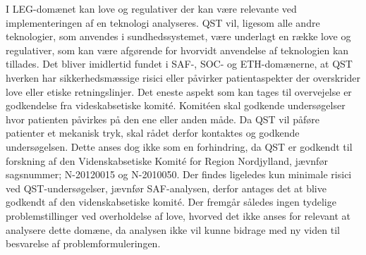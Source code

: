 I LEG-domænet kan love og regulativer der kan være relevante ved implementeringen af en teknologi analyseres. QST vil, ligesom alle andre teknologier, som anvendes i sundhedssystemet, være underlagt en række love og regulativer, som kan være afgørende for hvorvidt anvendelse af teknologien kan tillades. Det bliver imidlertid fundet i SAF-, SOC- og ETH-domænerne, at QST hverken har sikkerhedsmæssige risici eller påvirker patientaspekter der overskrider love eller etiske retningslinjer. Det eneste aspekt som kan tages til overvejelse er godkendelse fra videskabsetiske komité. Komitéen skal godkende undersøgelser hvor patienten påvirkes på den ene eller anden måde. Da QST vil påføre patienter et mekanisk tryk, skal rådet derfor kontaktes og godkende undersøgelsen.\citep{EtiskLov} Dette anses dog ikke som en forhindring, da QST er godkendt til forskning af den Videnskabsetiske Komité for Region Nordjylland, jævnfør sagsnummer; N-20120015 og N-2010050. Der findes ligeledes kun  minimale risici ved QST-undersøgelser, jævnfør SAF-analysen, derfor antages det at blive godkendt af den videnskabsetiske komité. Der fremgår således ingen tydelige problemstillinger ved overholdelse af love, hvorved det ikke anses for relevant at analysere dette domæne, da analysen ikke vil kunne bidrage med ny viden til besvarelse af problemformuleringen.

